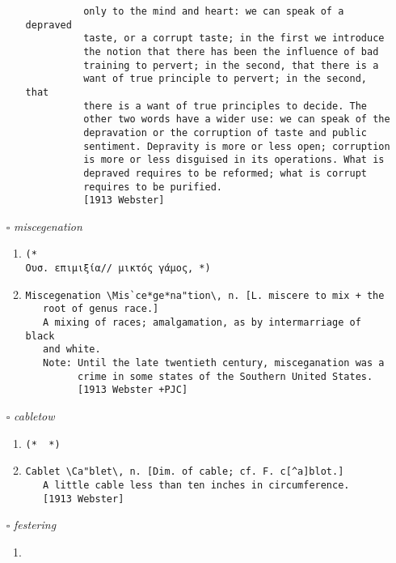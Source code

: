 \documentclass{article}
\begin{document}
\begin{itemize}
\begin{enumerate}
{\begin{lstlisting}
          only to the mind and heart: we can speak of a depraved
          taste, or a corrupt taste; in the first we introduce
          the notion that there has been the influence of bad
          training to pervert; in the second, that there is a
          want of true principle to pervert; in the second, that
          there is a want of true principles to decide. The
          other two words have a wider use: we can speak of the
          depravation or the corruption of taste and public
          sentiment. Depravity is more or less open; corruption
          is more or less disguised in its operations. What is
          depraved requires to be reformed; what is corrupt
          requires to be purified.
          [1913 Webster]
\end{lstlisting}}
\end{enumerate}
\item[$\square$] \emph{ miscegenation }
\begin{enumerate}
\item{
\begin{lstlisting}
(* 
Ουσ. επιμιξία// μικτός γάμος, *)
\end{lstlisting}}
\item{
\begin{lstlisting}
Miscegenation \Mis`ce*ge*na"tion\, n. [L. miscere to mix + the
   root of genus race.]
   A mixing of races; amalgamation, as by intermarriage of black
   and white.
   Note: Until the late twentieth century, misceganation was a
         crime in some states of the Southern United States.
         [1913 Webster +PJC]
\end{lstlisting}}
\end{enumerate}
\item[$\square$] \emph{ cabletow }
\begin{enumerate}
\item{
\begin{lstlisting}
(*  *)
\end{lstlisting}}
\item{
\begin{lstlisting}
Cablet \Ca"blet\, n. [Dim. of cable; cf. F. c[^a]blot.]
   A little cable less than ten inches in circumference.
   [1913 Webster]
\end{lstlisting}}
\end{enumerate}
\item[$\square$] \emph{ festering }
\begin{enumerate}
\item{
\begin{lstlisting}

\end{lstlisting}}
\end{enumerate}
\end{itemize}
\end{document}
